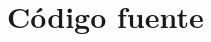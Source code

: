 \documentclass[12pt,a4paper,spanish,twoside]{book}
\begin{document}
\section{Código fuente}
% 

% 

% 

% 

% 

% 

% 

% 

% 
\end{document}

